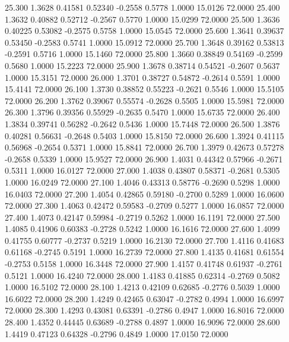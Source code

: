   25.300   1.3628   0.41581   0.52340  -0.2558   0.5778   1.0000  15.0126  72.0000
  25.400   1.3632   0.40882   0.52712  -0.2567   0.5770   1.0000  15.0299  72.0000
  25.500   1.3636   0.40225   0.53082  -0.2575   0.5758   1.0000  15.0545  72.0000
  25.600   1.3641   0.39637   0.53450  -0.2583   0.5741   1.0000  15.0912  72.0000
  25.700   1.3648   0.39162   0.53813  -0.2591   0.5716   1.0000  15.1460  72.0000
  25.800   1.3660   0.38849   0.54169  -0.2599   0.5680   1.0000  15.2223  72.0000
  25.900   1.3678   0.38714   0.54521  -0.2607   0.5637   1.0000  15.3151  72.0000
  26.000   1.3701   0.38727   0.54872  -0.2614   0.5591   1.0000  15.4141  72.0000
  26.100   1.3730   0.38852   0.55223  -0.2621   0.5546   1.0000  15.5105  72.0000
  26.200   1.3762   0.39067   0.55574  -0.2628   0.5505   1.0000  15.5981  72.0000
  26.300   1.3796   0.39356   0.55929  -0.2635   0.5470   1.0000  15.6735  72.0000
  26.400   1.3834   0.39741   0.56282  -0.2642   0.5436   1.0000  15.7448  72.0000
  26.500   1.3876   0.40281   0.56631  -0.2648   0.5403   1.0000  15.8150  72.0000
  26.600   1.3924   0.41115   0.56968  -0.2654   0.5371   1.0000  15.8841  72.0000
  26.700   1.3979   0.42673   0.57278  -0.2658   0.5339   1.0000  15.9527  72.0000
  26.900   1.4031   0.44342   0.57966  -0.2671   0.5311   1.0000  16.0127  72.0000
  27.000   1.4038   0.43807   0.58371  -0.2681   0.5305   1.0000  16.0249  72.0000
  27.100   1.4046   0.43313   0.58776  -0.2690   0.5298   1.0000  16.0403  72.0000
  27.200   1.4054   0.42865   0.59180  -0.2700   0.5289   1.0000  16.0600  72.0000
  27.300   1.4063   0.42472   0.59583  -0.2709   0.5277   1.0000  16.0857  72.0000
  27.400   1.4073   0.42147   0.59984  -0.2719   0.5262   1.0000  16.1191  72.0000
  27.500   1.4085   0.41906   0.60383  -0.2728   0.5242   1.0000  16.1616  72.0000
  27.600   1.4099   0.41755   0.60777  -0.2737   0.5219   1.0000  16.2130  72.0000
  27.700   1.4116   0.41683   0.61168  -0.2745   0.5191   1.0000  16.2739  72.0000
  27.800   1.4135   0.41681   0.61554  -0.2753   0.5158   1.0000  16.3448  72.0000
  27.900   1.4157   0.41748   0.61937  -0.2761   0.5121   1.0000  16.4240  72.0000
  28.000   1.4183   0.41885   0.62314  -0.2769   0.5082   1.0000  16.5102  72.0000
  28.100   1.4213   0.42109   0.62685  -0.2776   0.5039   1.0000  16.6022  72.0000
  28.200   1.4249   0.42465   0.63047  -0.2782   0.4994   1.0000  16.6997  72.0000
  28.300   1.4293   0.43081   0.63391  -0.2786   0.4947   1.0000  16.8016  72.0000
  28.400   1.4352   0.44445   0.63689  -0.2788   0.4897   1.0000  16.9096  72.0000
  28.600   1.4419   0.47123   0.64328  -0.2796   0.4849   1.0000  17.0150  72.0000
